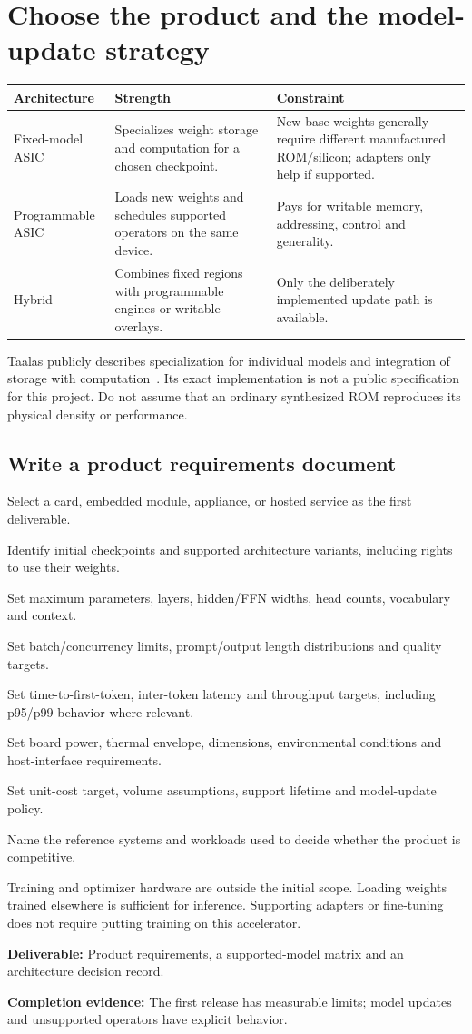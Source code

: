 \documentclass[11pt,a4paper]{article}
\newcommand{\phase}[2]{\clearpage\section{#1}\label{#2}}
\newcommand{\deliver}[2]{\begin{tcolorbox}[colback=pale,colframe=line,boxrule=0.5pt,arc=1mm,left=8pt,right=8pt,top=6pt,bottom=6pt]\textbf{Deliverable:} #1\par\textbf{Completion evidence:} #2\end{tcolorbox}}
\begin{document}
\phase{Choose the product and the model-update strategy}{sec:product}
\begin{tabularx}{\linewidth}{@{}p{30mm}Y Y@{}}
\toprule\textbf{Architecture} & \textbf{Strength} & \textbf{Constraint}\\\midrule
Fixed-model ASIC & Specializes weight storage and computation for a chosen checkpoint. & New base weights generally require different manufactured ROM/silicon; adapters only help if supported.\\
Programmable ASIC & Loads new weights and schedules supported operators on the same device. & Pays for writable memory, addressing, control and generality.\\
Hybrid & Combines fixed regions with programmable engines or writable overlays. & Only the deliberately implemented update path is available.\\\bottomrule
\end{tabularx}
Taalas publicly describes specialization for individual models and integration
of storage with computation~\cite{taalas}. Its exact implementation is not a
public specification for this project. Do not assume that an ordinary synthesized
ROM reproduces its physical density or performance.

\subsection*{Write a product requirements document}
\begin{checklist}
\item Select a card, embedded module, appliance, or hosted service as the first deliverable.
\item Identify initial checkpoints and supported architecture variants, including rights to use their weights.
\item Set maximum parameters, layers, hidden/FFN widths, head counts, vocabulary and context.
\item Set batch/concurrency limits, prompt/output length distributions and quality targets.
\item Set time-to-first-token, inter-token latency and throughput targets, including p95/p99 behavior where relevant.
\item Set board power, thermal envelope, dimensions, environmental conditions and host-interface requirements.
\item Set unit-cost target, volume assumptions, support lifetime and model-update policy.
\item Name the reference systems and workloads used to decide whether the product is competitive.
\end{checklist}
Training and optimizer hardware are outside the initial scope. Loading weights
trained elsewhere is sufficient for inference. Supporting adapters or fine-tuning
does not require putting training on this accelerator.
\deliver{Product requirements, a supported-model matrix and an architecture
decision record.}{The first release has measurable limits; model updates and
unsupported operators have explicit behavior.}
\end{document}
